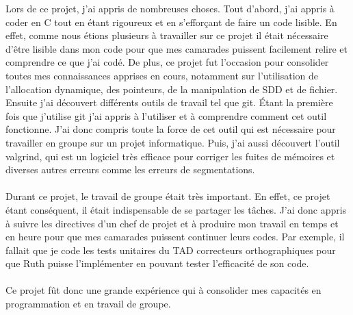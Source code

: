 Lors de ce projet, j'ai appris de nombreuses choses. Tout d'abord, j'ai appris à coder en C tout en étant rigoureux et en s'efforçant de faire un code lisible. En effet, comme nous étions plusieurs à travailler sur ce projet il était nécessaire d'être lisible dans mon code pour que mes camarades puissent facilement relire et comprendre ce que j'ai codé. De plus, ce projet fut l'occasion pour consolider toutes mes connaissances apprises en cours, notamment sur l'utilisation de l'allocation dynamique, des pointeurs, de la manipulation de SDD et de fichier. Ensuite j'ai découvert différents outils de travail tel que git. Étant la première fois que j'utilise git j'ai appris à l'utiliser et à comprendre comment cet outil fonctionne. J'ai donc compris toute la force de cet outil qui est nécessaire pour travailler en groupe sur un projet informatique. Puis, j'ai aussi découvert l'outil valgrind, qui est un logiciel très efficace pour corriger les fuites de mémoires et diverses autres erreurs comme les erreurs de segmentations.\\\\
Durant ce projet, le travail de groupe était très important. En effet, ce projet étant conséquent, il était indispensable de se partager les tâches. J'ai donc appris à suivre les directives d'un chef de projet et à produire mon travail en temps et en heure pour que mes camarades puissent continuer leurs codes. Par exemple, il fallait que je code les tests unitaires du TAD correcteurs orthographiques pour que Ruth puisse l'implémenter en pouvant tester l'efficacité de son code.\\\\
Ce projet fût donc une grande expérience qui à consolider mes capacités en programmation et en travail de groupe.